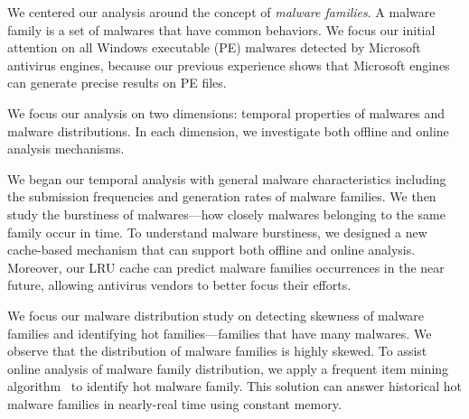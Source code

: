We centered our analysis around the concept of {\em malware families}.
A malware family is a set of malwares that have common behaviors.
We focus our initial attention on all Windows executable (PE) malwares detected by Microsoft
antivirus engines, 
because our previous experience shows that Microsoft engines can generate precise results on PE files.

We focus our analysis on two dimensions: temporal properties of malwares and 
malware distributions.
In each dimension, we investigate both offline and online analysis mechanisms.

We began our temporal analysis with general malware characteristics including the submission
frequencies and generation rates of malware families. 
We then study the burstiness of malwares---how closely malwares belonging to the same family occur in time. 
To understand malware burstiness, we designed a new cache-based mechanism 
that can support both offline and online analysis.
Moreover, our LRU cache can predict malware families occurrences in the near future, 
allowing antivirus vendors to better focus their efforts. 

We focus our malware distribution study on detecting skewness of malware 
families and identifying hot families---families that have many malwares.
We observe that the distribution of malware families is highly skewed. 
To assist online analysis of malware family distribution, 
we apply a frequent item mining algorithm~\cite{space-saving} to identify hot malware family. 
This solution can answer historical hot malware families in nearly-real time using constant memory. 



